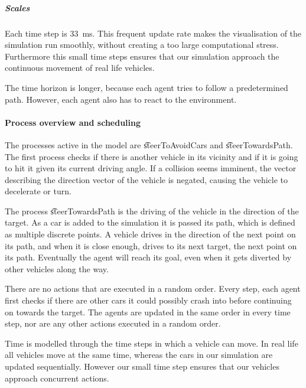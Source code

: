 	\subparagraph{Scales}
	Each time step is \si{33 \milli\second}. This frequent update rate makes the visualisation of the simulation run smoothly, without creating a too large computational stress. Furthermore this small time steps ensures that our simulation approach the continuous movement of real life vehicles.

	The time horizon is longer, because each agent tries to follow a predetermined path. However, each agent also has to react to the environment. 




\paragraph{Process overview and scheduling}
\label{par:method:model:overview:process}
The processes active in the model are \t{steerToAvoidCars} and \t{steerTowardsPath}. The first process checks if there is another vehicle in its vicinity and if it is going to hit it given its current driving angle. If a collision seems imminent, the vector describing the direction vector of the vehicle is negated, causing the vehicle to decelerate or turn.

The process \t{steerTowardsPath} is the driving of the vehicle in the direction of the target. As a car is added to the simulation it is passed its path, which is defined as multiple discrete points.  A vehicle drives in the direction of the next point on its path, and when it is close enough, drives to its next target, the next point on its path. Eventually the agent will reach its goal, even when it gets diverted by other vehicles along the way.

There are no actions that are executed in a random order.
Every step, each agent first checks if there are other cars it could possibly crash into before continuing on towards the target. The agents are updated in the same order in every time step, nor are any other actions executed in a random order.

Time is modelled through the time steps in which a vehicle can move. In real life all vehicles move at the same time, whereas the cars in our simulation are updated sequentially. However our small time step ensures that our vehicles approach concurrent actions. 


